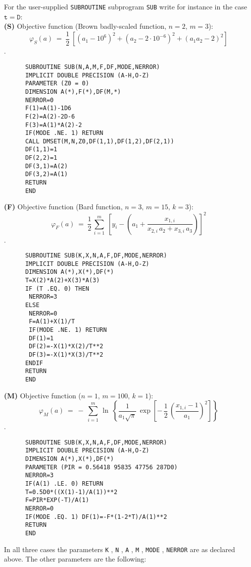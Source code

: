 \newpage
\Examples
For the user-supplied {\tt SUBROUTINE} subprogram {\tt SUB} write for
instance in the case $\mathtt{t = D}$: \\

{\bf (S)} Objective function (Brown badly-scaled function, $n=2,\,m=3$):
$$ \varphi_S(a) \ = \ \frac{1}{2} \:
\left[(a_1-10^6)^2+(a_2-2\cdot 10^{-6})^2+(a_1a_2-2)^2 \right] $$ .
\begin{verbatim}
      SUBROUTINE SUB(N,A,M,F,DF,MODE,NERROR)
      IMPLICIT DOUBLE PRECISION (A-H,O-Z)
      PARAMETER (Z0 = 0)
      DIMENSION A(*),F(*),DF(M,*)
      NERROR=0
      F(1)=A(1)-1D6
      F(2)=A(2)-2D-6
      F(3)=A(1)*A(2)-2
      IF(MODE .NE. 1) RETURN
      CALL DMSET(M,N,Z0,DF(1,1),DF(1,2),DF(2,1))
      DF(1,1)=1
      DF(2,2)=1
      DF(3,1)=A(2)
      DF(3,2)=A(1)
      RETURN
      END
\end{verbatim}

{\bf (F)} Objective function (Bard function, $n=3,\,m=15,\,k=3$):
$$ \varphi_F(a) \ = \ \frac{1}{2} \, \sum_{i=1}^m \:
\left[y_i - \left(a_1+ \frac{x_{1,i}}{x_{2,i}\,a_2+x_{3,i}\,a_3}\right)
\right]^2 $$ .
\begin{verbatim}
      SUBROUTINE SUB(K,X,N,A,F,DF,MODE,NERROR)
      IMPLICIT DOUBLE PRECISION (A-H,O-Z)
      DIMENSION A(*),X(*),DF(*)
      T=X(2)*A(2)+X(3)*A(3)
      IF (T .EQ. 0) THEN
       NERROR=3
      ELSE
       NERROR=0
       F=A(1)+X(1)/T
       IF(MODE .NE. 1) RETURN
       DF(1)=1
       DF(2)=-X(1)*X(2)/T**2
       DF(3)=-X(1)*X(3)/T**2
      ENDIF
      RETURN
      END
\end{verbatim}

\newpage
{\bf (M)} Objective function ($n=1,\,m=100,\,k=1$):
$$ \varphi_M(a) \ = \ -\:\sum_{i=1}^m\, \ln \: \left\{
\frac{1}{a_1\sqrt{\pi}} \, \exp \left[- \,\frac{1}{2} \,
\left(\frac{x_{1,i}-1}{a_1} \right)^2 \right] \right\} $$ .
\begin{verbatim}
      SUBROUTINE SUB(K,X,N,A,F,DF,MODE,NERROR)
      IMPLICIT DOUBLE PRECISION (A-H,O-Z)
      DIMENSION A(*),X(*),DF(*)
      PARAMETER (PIR = 0.56418 95835 47756 287D0)
      NERROR=3
      IF(A(1) .LE. 0) RETURN
      T=0.5D0*((X(1)-1)/A(1))**2
      F=PIR*EXP(-T)/A(1)
      NERROR=0
      IF(MODE .EQ. 1) DF(1)=-F*(1-2*T)/A(1)**2
      RETURN
      END
\end{verbatim}

In all three cases the parameters {\tt K} , {\tt N} ,
{\tt A} , {\tt M} , {\tt MODE} , {\tt NERROR} are as declared
above. The other parameters are the following:

